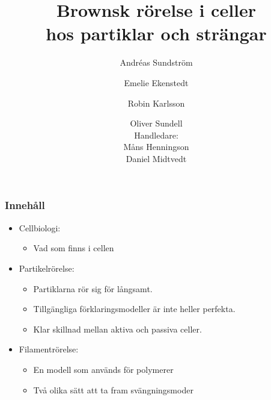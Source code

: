 \documentclass[swedish]{beamer}
\title[Brownsk rörelse i celler]{Brownsk rörelse i celler\\ hos partiklar och strängar} %
\subtitle{} %
\author{Andréas Sundström \and Emelie Ekenstedt \and Robin Karlsson \and Oliver Sundell 
\\[.4cm] {\small Handledare:\\ Måns Henningson \\ Daniel Midtvedt} } %
\institute[Chalmers]{Chalmers tekniska högskola, \\Institutionen för fysik}
\date{\vspace{-0.25cm}}
\begin{document}
\begin{frame}[plain]

\linethickness{0.075mm}

  \titlepage
\end{frame}









\begin{frame}
\frametitle{Innehåll}

\begin{itemize}[label={$\bullet$}]
    \item Cellbiologi:
    \begin{itemize}[label={--}]
        \item Vad som finns i cellen
    \end{itemize}
    \item Partikelrörelse:
    \begin{itemize}[label={--}]
        \item Partiklarna rör sig för långsamt. 
        \item Tillgängliga förklaringsmodeller är inte heller perfekta. 
        \item Klar skillnad mellan aktiva och passiva celler.
    \end{itemize}
    \item Filamentrörelse:
    \begin{itemize}[label={--}]
        \item En modell som används för polymerer
        \item Två olika sätt att ta fram svängningsmoder
    \end{itemize}
\end{itemize}


\end{frame}
\end{document}
